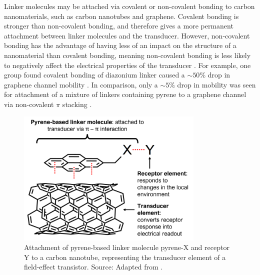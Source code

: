 \documentclass[
  a4paper,
]{scrbook}
\begin{document}
Linker molecules may be attached via covalent or non-covalent bonding to
carbon nanomaterials, such as carbon nanotubes and graphene. Covalent
bonding is stronger than non-covalent bonding, and therefore gives a
more permanent attachment between linker molecules and the transducer.
However, non-covalent bonding has the advantage of having less of an
impact on the structure of a nanomaterial than covalent bonding, meaning
non-covalent bonding is less likely to negatively affect the electrical
properties of the transducer
\autocite{Long2012,DiCrescenzo2014,Wang2020,Khan2021,Mishyn2022}. For
example, one group found covalent bonding of diazonium linker caused a
\(\sim 50\)\% drop in graphene channel mobility \autocite{Lerner2014}.
In comparison, only a \(\sim 5\)\% drop in mobility was seen for
attachment of a mixture of linkers containing pyrene to a graphene
channel via non-covalent \(\pi\) stacking \autocite{Thodkar2021}.

\begin{figure}

{\centering \includegraphics[width=0.8\textwidth,height=\textheight]{figures/ch7/pyrene-cnt.png}

}

\caption{\label{fig-pi-interaction-cnt}Attachment of pyrene-based linker
molecule pyrene-X and receptor Y to a carbon nanotube, representing the
transducer element of a field-effect transistor. Source: Adapted from
\autocite{Carbonnanotube}.}

\end{figure}
\end{document}
